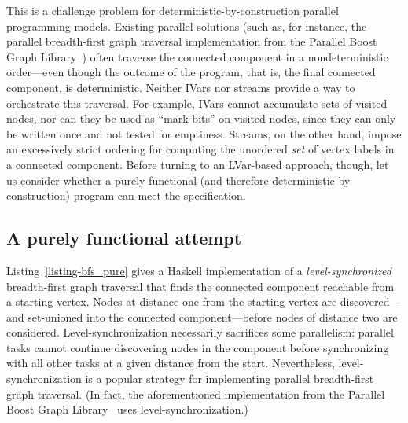 This is a challenge problem for deterministic-by-construction parallel
programming models. Existing parallel solutions (such as, for instance, the
parallel breadth-first graph traversal implementation from the
Parallel Boost Graph Library~) often traverse the
connected component in a nondeterministic order---even though the
outcome of the program, that is, the final connected component, is
deterministic.  Neither IVars nor streams provide a way 
to orchestrate this traversal.  For
example, IVars cannot accumulate sets of visited nodes, nor can they
be used as ``mark bits'' on visited nodes, since they can only be
written once and not tested for emptiness.  Streams, on the other
hand, impose an excessively strict ordering for computing the
unordered \emph{set} of vertex labels in a connected component.
Before turning to an LVar-based approach, though, let us consider
whether a purely functional (and therefore deterministic by
construction) program can meet the specification.

\subsection{A purely functional attempt}

\singlespacing

\doublespacing

Listing~\ref{listing-bfs_pure} gives a Haskell implementation of a
\emph{level-synchronized} breadth-first graph traversal that finds the
connected component reachable from a starting vertex.  Nodes at
distance one from the starting vertex are discovered---and set-unioned
into the connected component---before nodes of distance two are
considered.  Level-synchronization necessarily sacrifices some
parallelism: parallel tasks cannot continue discovering nodes in the
component before synchronizing with all other tasks at a given
distance from the start.  Nevertheless, level-synchronization is a
popular strategy for implementing parallel breadth-first graph
traversal.  (In fact, the aforementioned implementation from the
Parallel Boost Graph Library~ uses
level-synchronization.)

